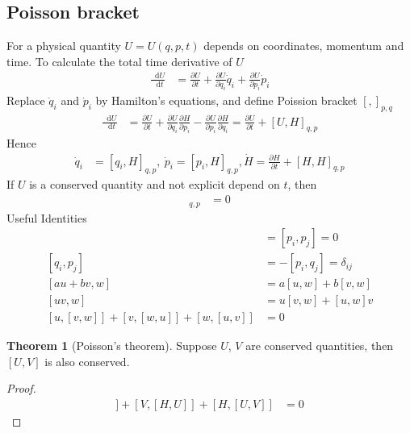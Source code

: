 \documentclass[twoside,9pt]{article}
\numberwithin{equation}{section} %
\newcommand{\lms}{\fontfamily{lmss}\selectfont} %
\renewcommand*\d{\mathop{}\!\mathrm{d}}
\theoremstyle{definition}
\newtheorem{theorem}{\lms Theorem}[section]
\theoremstyle{remark}
\begin{document}
\subsection{Poisson bracket}
For a physical quantity $U=U(q,p,t)$ depends on coordinates,
momentum and time.
To calculate the total time derivative of $U$
\begin{align}
    \frac{\d U}{\d t} &= 
    \frac{\partial U}{\partial t} + 
    \frac{\partial U}{\partial q_i}\dot q_i + 
    \frac{\partial U}{\partial p_i}\dot p_i
\end{align}
Replace $\dot q_i$ and $\dot p_i$ by Hamilton's equations,
and define Poission bracket $[,]_{p,q}$
\begin{align}
    \frac{\d U}{\d t} &= 
    \frac{\partial U}{\partial t} + 
    \frac{\partial U}{\partial q_i}
    \frac{\partial H}{\partial p_i} - 
    \frac{\partial U}{\partial p_i}
    \frac{\partial H}{\partial q_i}
    = 
    \frac{\partial U }{\partial t } + 
    [U, H]_{q,p}
\end{align}
Hence
\begin{align}
    \dot q_i &= [q_i, H]_{q,p},~
    \dot p_i  = [p_i, H]_{q,p},
    \dot H    = \frac{\partial H}{\partial t} + [H, H]_{q,p}
\end{align}
If $U$ is a conserved quantity and not explicit depend on $t$,
then
\begin{align}
    [U, H]_{q,p} &= 0
\end{align}
Useful Identities
\begin{align}
    [q_i,q_j] &= [p_i,p_j] = 0\\
    [q_i,p_j] &= -[p_i,q_j] = \delta_{ij}\\
    [au+bv, w] &= a[u, w] + b[v, w]\\
    [uv, w] &= u[v, w] + [u, w]v\\
    [u, [v,w]] + [v, [w, u]] + [w, [u, v]] &= 0
\end{align}
\begin{theorem}[Poisson's theorem]
Suppose $U$, $V$ are conserved quantities,
then $[U, V]$ is also conserved.
\end{theorem}
\begin{proof}
\begin{align}
    [U, [V, H]] + [V, [H, U]] + [H, [U, V]] &= 0
\end{align}
\end{proof}
\end{document}
